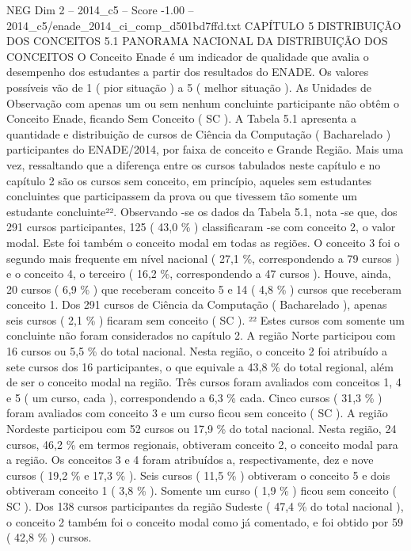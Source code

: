 \begin{textsample}{NEG Dim 2 – 2014\_c5 – Score -1.00 – 2014\_c5/enade\_2014\_ci\_comp\_d501bd7ffd.txt}  \label{ex:f2_neg_129}
CAPÍTULO 5 DISTRIBUIÇÃO DOS CONCEITOS 5.1 PANORAMA NACIONAL DA DISTRIBUIÇÃO DOS CONCEITOS O Conceito Enade é um indicador de qualidade que avalia o desempenho dos estudantes a partir dos resultados do ENADE.
Os valores possíveis vão de 1 ( pior situação ) a 5 ( melhor situação ).
As Unidades de Observação com apenas um ou sem nenhum concluinte participante não obtêm o Conceito Enade, ficando Sem Conceito ( SC ).
A Tabela 5.1 apresenta a quantidade e distribuição de cursos de Ciência da Computação ( Bacharelado ) participantes do ENADE/2014, por faixa de conceito e Grande Região.
Mais uma vez, ressaltando que a diferença entre os cursos tabulados neste capítulo e no capítulo 2 são os cursos sem conceito, em princípio, aqueles sem estudantes concluintes que participassem da prova ou que tivessem tão somente um estudante concluinte²².
Observando -se os dados da Tabela 5.1, nota -se que, dos 291 cursos participantes, 125 ( 43,0 \% ) classificaram -se com conceito 2, o valor modal.
Este foi também o conceito modal em todas as regiões.
O conceito 3 foi o segundo mais frequente em nível nacional ( 27,1 \%, correspondendo a 79 cursos ) e o conceito 4, o terceiro ( 16,2 \%, correspondendo a 47 cursos ).
Houve, ainda, 20 cursos ( 6,9 \% ) que receberam conceito 5 e 14 ( 4,8 \% ) cursos que receberam conceito 1.
Dos 291 cursos de Ciência da Computação ( Bacharelado ), apenas seis cursos ( 2,1 \% ) ficaram sem conceito ( SC ). ²² Estes cursos com somente um concluinte não foram considerados no capítulo 2.
A região Norte participou com 16 cursos ou 5,5 \% do total nacional.
Nesta região, o conceito 2 foi atribuído a sete cursos dos 16 participantes, o que equivale a 43,8 \% do total regional, além de ser o conceito modal na região.
Três cursos foram avaliados com conceitos 1, 4 e 5 ( um curso, cada ), correspondendo a 6,3 \% cada.
Cinco cursos ( 31,3 \% ) foram avaliados com conceito 3 e um curso ficou sem conceito ( SC ).
A região Nordeste participou com 52 cursos ou 17,9 \% do total nacional.
Nesta região, 24 cursos, 46,2 \% em termos regionais, obtiveram conceito 2, o conceito modal para a região.
Os conceitos 3 e 4 foram atribuídos a, respectivamente, dez e nove cursos ( 19,2 \% e 17,3 \% ).
Seis cursos ( 11,5 \% ) obtiveram o conceito 5 e dois obtiveram conceito 1 ( 3,8 \% ).
Somente um curso ( 1,9 \% ) ficou sem conceito ( SC ).
Dos 138 cursos participantes da região Sudeste ( 47,4 \% do total nacional ), o conceito 2 também foi o conceito modal como já comentado, e foi obtido por 59 ( 42,8 \% ) cursos.

\end{textsample}
